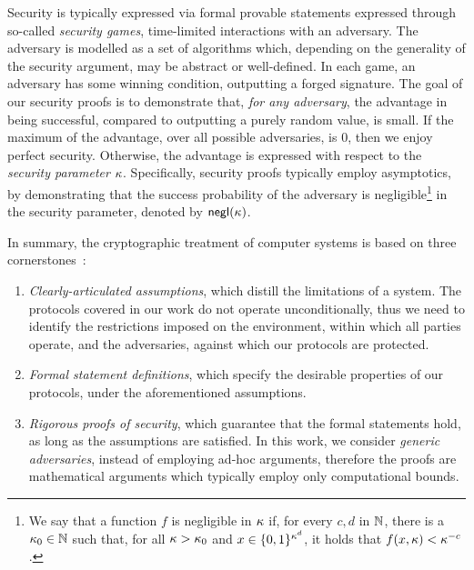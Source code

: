 Security is typically expressed via formal provable statements expressed
through so-called \emph{security games}, \ie time-limited interactions with an
adversary. The adversary is modelled as a set of algorithms which, depending on
the generality of the security argument, may be abstract or well-defined. In
each game, an adversary has some winning condition, \eg outputting a forged
signature. The goal of our security proofs is to demonstrate that, \emph{for
any adversary}, the advantage in being successful, compared to outputting a
purely random value, is small. If the maximum of the advantage, over all
possible adversaries, is $0$, then we enjoy perfect security. Otherwise, the
advantage is expressed with respect to the \emph{security parameter}
$\kappa$. Specifically, security proofs typically employ asymptotics, by
demonstrating that the success probability of the adversary is
negligible\footnote{We say that a function $f$ is negligible in $\kappa$ if,
for every $c, d$ in $\mathbb{N}$, there is a $\kappa_{0} \in \mathbb{N}$ such
that, for all $\kappa > \kappa_{0}$ and $x \in \{ 0, 1
\}^{\kappa^{d}}$, it holds that $f(x, \kappa) < \kappa^{-c}$.} in
the security parameter, denoted by $\mathsf{negl}(\kappa)$.

In summary, the cryptographic treatment of computer systems is based on three
cornerstones~\cite{katz2020introduction}:
\begin{enumerate}
    \item \emph{Clearly-articulated assumptions}, which distill the
    limitations of a system. The protocols covered in our work do not operate
    unconditionally, thus we need to identify the restrictions imposed on the
    environment, within which all parties operate, and the adversaries, against
    which our protocols are protected.
    \item \emph{Formal statement definitions}, which specify the desirable
    properties of our protocols, under the aforementioned assumptions.
    \item \emph{Rigorous proofs of security}, which guarantee that the formal
    statements hold, as long as the assumptions are satisfied. In this work, we
    consider \emph{generic adversaries}, instead of employing ad-hoc arguments,
    therefore the proofs are mathematical arguments which typically employ only
    computational bounds.
\end{enumerate}

